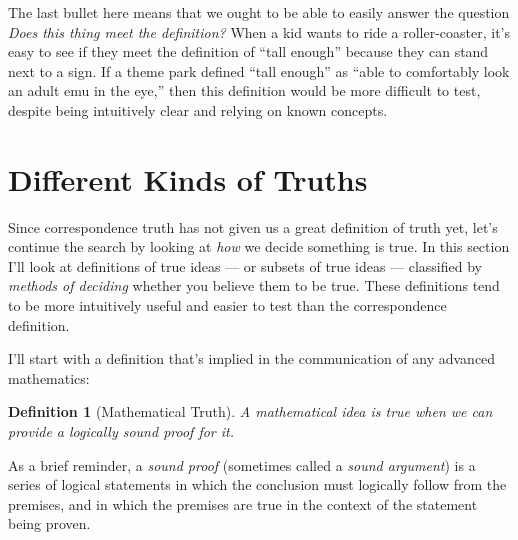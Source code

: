 \documentclass[9pt, twoside]{book}
\newtheorem*{defn}{Definition}
\theoremstyle{argtstyle}
\begin{document}
The last bullet here means that
we ought to be able to easily
answer the question {\em Does this thing
meet the definition?}
When a kid wants to ride a roller-coaster,
it's easy to see if they meet the definition
of ``tall enough'' because they can stand
next to a sign. If a theme park defined
``tall enough'' as ``able to comfortably
look an adult emu in the eye,'' then this
definition would be more difficult to test,
despite being intuitively clear and
relying on known concepts.


\section{Different Kinds of Truths}

Since correspondence truth has not given
us a great definition of truth yet, let's
continue the search by looking at {\em how}
we decide something is true.
In this section I'll look at definitions
of true ideas ---
or subsets of true ideas ---
classified by {\em methods of deciding}
whether you
believe them to be true.
These definitions tend to be more intuitively useful and easier to
test than the correspondence definition.

I'll start with a definition that's
implied in the communication of any advanced mathematics:

\begin{defn}[Mathematical Truth]
    A mathematical idea is true when we can provide a logically sound proof for
    it.
\end{defn}

As a brief reminder, a {\em sound proof} (sometimes called a
{\em sound argument}) is a series of logical statements in
which the conclusion must logically follow from the premises, and in which the
premises are true in the context of the statement being proven.
\end{document}
